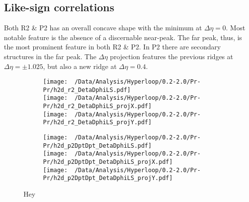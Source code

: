 \documentclass[12pt,a4paper,twoside]{report}
\begin{document}
\subsection{Like-sign correlations}
Both R2 \& P2 has an overall concave shape with the minimum at $\Delta\eta=0$. Most notable feature is the absence of a discernable near-peak. The far peak, thus, is the most prominent feature in both R2 \& P2. In P2 there are secondary structures in the far peak. The $\Delta\eta$ projection features the previous ridges at $\Delta\eta=\pm1.025$, but also a new ridge at $\Delta\eta=0.4$.
\begin{figure}[H]
	\begin{subfigure}{0.49\linewidth}
		\texttt{[image: ~/Data/Analysis/Hyperloop/0.2-2.0/Pr-Pr/h2d\_r2\_DetaDphiLS.pdf]}\\
		\texttt{[image: ~/Data/Analysis/Hyperloop/0.2-2.0/Pr-Pr/h2d\_r2\_DetaDphiLS\_projX.pdf]}\\
		\texttt{[image: ~/Data/Analysis/Hyperloop/0.2-2.0/Pr-Pr/h2d\_r2\_DetaDphiLS\_projY.pdf]}\\
	\end{subfigure}
	\begin{subfigure}{0.49\linewidth}
		\texttt{[image: ~/Data/Analysis/Hyperloop/0.2-2.0/Pr-Pr/h2d\_p2DptDpt\_DetaDphiLS.pdf]}\\
		\texttt{[image: ~/Data/Analysis/Hyperloop/0.2-2.0/Pr-Pr/h2d\_p2DptDpt\_DetaDphiLS\_projX.pdf]}\\
		\texttt{[image: ~/Data/Analysis/Hyperloop/0.2-2.0/Pr-Pr/h2d\_p2DptDpt\_DetaDphiLS\_projY.pdf]}\\
	\end{subfigure}
	\caption{Hey}
\end{figure}
\end{document}
